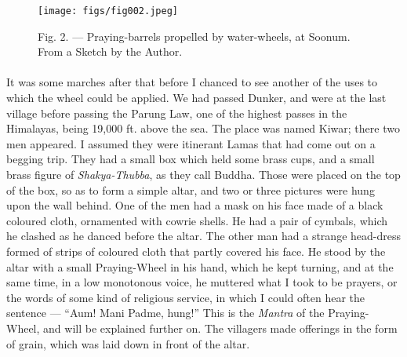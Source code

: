 \documentclass[a4paper, 11pt, oneside, polutonikogreek, english]{article}
\begin{document}
\begin{figure}[H]
\centering
\texttt{[image: figs/fig002.jpeg]}
\caption[Fig. 2. --- Praying-barrels propelled by water-wheels, at Soonum.]{Fig. 2. --- Praying-barrels propelled by water-wheels, at Soonum. From a Sketch by the Author.}
\end{figure}
\paragraph{}
It was some marches after that before I chanced to see another of the uses to which the wheel could be applied. We had passed Dunker, and were at the last village before passing the Parung Law, one of the highest passes in the Himalayas, being 19,000 ft. above the sea. The place was named Kiwar; there two men appeared. I assumed they were itinerant Lamas that had come out on a begging trip. They had a small box which held some brass cups, and a small brass figure of \emph{Shakya-Thubba}, as they call Buddha. Those were placed on the top of the box, so as to form a simple altar, and two or three pictures were hung upon the wall behind. One of the men had a mask on his face made of a black coloured cloth, ornamented with cowrie shells. He had a pair of cymbals, which he clashed as he danced before the altar. The other man had a strange head-dress formed of strips of coloured cloth that partly covered his face. He stood by the altar with a small Praying-Wheel in his hand, which he kept turning, and at the same time, in a low monotonous voice, he muttered what I took to be prayers, or the words of some kind of religious service, in which I could often hear the sentence --- ``Aum! Mani Padme, hung!'' This is the \emph{Mantra} of the Praying-Wheel, and will be explained further on. The villagers made offerings in the form of grain, which was laid down in front of the altar.
\end{document}
